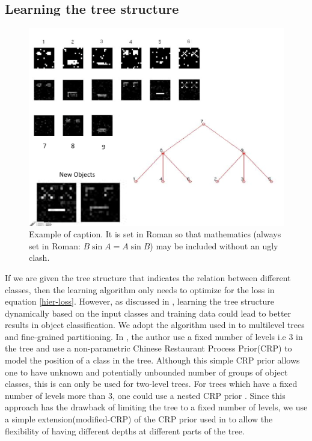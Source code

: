 \documentclass[10pt,twocolumn,letterpaper]{article}
\begin{document}
\subsection{Learning the tree structure}
 \begin{figure}[t]
 	\begin{center}
 		\includegraphics[width=0.8\linewidth]{smiley}
 	\end{center}
 	\caption{Example of caption.  It is set in Roman so that mathematics
 		(always set in Roman: $B \sin A = A \sin B$) may be included without an
 		ugly clash.}
 	\label{fig:long}
 	\label{fig:onecol}
 \end{figure}
If we are given the tree structure that indicates the relation between different classes, then the 
learning algorithm only needs to optimize for the loss in equation \ref{hier-loss}. However, as 
discussed in \cite{ruslan}, learning the tree structure dynamically based on the input classes and training data
could lead to better results in object classification. We adopt the algorithm used in \cite{ruslan} to multilevel trees
and fine-grained partitioning. In \cite{ruslan}, the author use a fixed number of levels i.e 3 in the tree and use
a non-parametric Chinese Restaurant Process Prior(CRP) to model the position of a class in the tree. Although this simple
CRP prior allows one to have unknown and potentially unbounded number of groups of object classes, this is can only be
used for two-level trees. For trees which have a fixed number of levels more than 3, one could use a nested CRP prior \cite{nestedCRP}.
Since this approach has the drawback of limiting the tree to a fixed number of levels, we use a simple extension(modified-CRP) of the
CRP prior used in \cite{ruslan} to allow the flexibility of  having different depths at different parts of the tree.    
\end{document}
